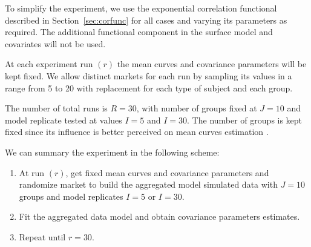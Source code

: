 To simplify the experiment, we use the exponential correlation functional described in Section~\ref{sec:corfunc} for all cases and varying its parameters as required. The additional functional component in the surface model and covariates will not be used.%

At each experiment run $(r)$ the mean curves and covariance parameters will be kept fixed. We allow distinct markets for each run by sampling its values in a range from 5 to 20 with replacement for each type of subject and each group. 

The number of total runs is $R=30$, with number of groups fixed at $J=10$ and model replicate tested at values $I=5$ and $I=30$. The number of groups is kept fixed since its influence is better perceived on mean curves estimation \cite{dias2009non,dias2013hierarchical}.

We can summary the experiment in the following scheme:

\begin{enumerate}
\item At run $(r)$, get fixed mean curves and covariance parameters and randomize market to build the aggregated model simulated data with $J=10$ groups and model replicates $I=5$ or $I=30$.
\item Fit the aggregated data model and obtain covariance parameters estimates.
\item Repeat until $r=30$.
\end{enumerate}







